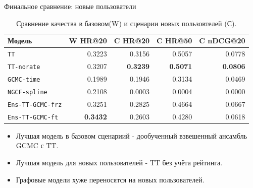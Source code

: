 \documentclass{beamer}
\begin{document}
\begin{frame}{Финальное сравнение: новые пользователи}
\small

\scriptsize
\begin{table}
\centering
\caption{\scriptsize Сравнение качества в базовом(W) и сценарии новых пользовтелей (С).}
\setlength{\tabcolsep}{4pt}
\begin{tabular}{@{}lrrrr@{}}
\toprule
Модель & W HR@20 & C HR@20 & C HR@50 & C nDCG@20 \\
\midrule
\texttt{TT} & 0.3223 & 0.3156 & 0.5057 & 0.0778 \\
\texttt{TT-norate} & 0.3207 & \textbf{0.3239} & \textbf{0.5071} & \textbf{0.0806} \\
\texttt{GCMC-time} & 0.1989 & 0.1946 & 0.3134 & 0.0469 \\
\texttt{NGCF-spline} & 0.2108 & 0.0003 & 0.0004 & 0.0000 \\
\texttt{Ens-TT-GCMC-frz} & 0.3251 & 0.2825 & 0.4664 & 0.0667 \\
\texttt{Ens-TT-GCMC-ft} & \textbf{0.3432} & 0.2603 & 0.4280 & 0.0618 \\
\bottomrule
\end{tabular}
\end{table}

\footnotesize
\begin{itemize}
  \item Лучшая модель в базовом сценариий - дообученный взвешенный ансамбль GCMC с TT.
  \item Лучшая модель для новых пользователей - TT без учёта рейтинга.
  \item Графовые модели хуже переносятся на новых пользователей.
\end{itemize}



\end{frame}
\end{document}
